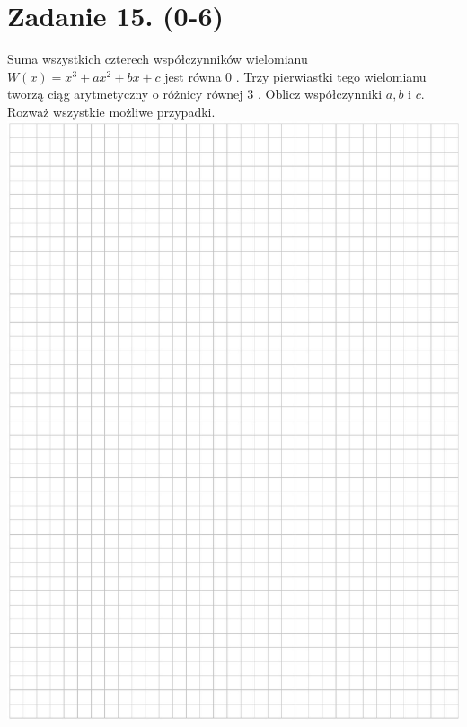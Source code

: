 \documentclass[10pt]{article}
\begin{document}
\section*{Zadanie 15. (0-6)}
Suma wszystkich czterech współczynników wielomianu \(W(x)=x^{3}+a x^{2}+b x+c\) jest równa 0 . Trzy pierwiastki tego wielomianu tworzą ciąg arytmetyczny o różnicy równej 3 . Oblicz współczynniki \(a, b\) i \(c\). Rozważ wszystkie możliwe przypadki.\\
\includegraphics[max width=\textwidth, center]{2024_11_21_838c0cfd77f195c20440g-18}\\
\end{document}
